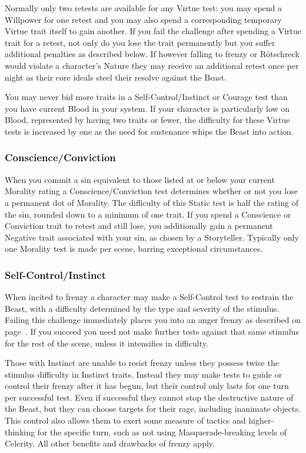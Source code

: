 Normally only two retests are available for any Virtue test:  you may spend a Willpower 
for one retest and you may also spend a corresponding temporary Virtue trait itself to 
gain another.  If you fail the challenge after spending a Virtue trait for a retest, not 
only do you lose the trait permanently but you suffer additional penalties as described 
below.  If however falling to frenzy or R\"{o}tschreck would violate a character's Nature 
they may receive an additional retest once per night as their core ideals steel their 
resolve against the Beast.

You may never bid more traits in a Self-Control/Instinct or Courage test than you have current 
Blood in your system.  If your character is particularly low on Blood, represented by having 
two traits or fewer, the difficulty for these Virtue tests is increased by one as the need for 
sustenance whips the Beast into action.

\subsubsection{Conscience/Conviction}
When you commit a sin equivalent to those listed at or below your current Morality rating 
a Conscience/Conviction test determines whether or not you lose a permanent dot of Morality.  
The difficulty of this Static test is half the rating of the sin, rounded down to a minimum 
of one trait.  If you spend a Conscience or Conviction trait to retest and still lose, you 
additionally gain a permanent Negative trait associated with your sin, as chosen by a 
Storyteller.  Typically only one Morality test is made per scene, barring exceptional 
circumstances.

\subsubsection{Self-Control/Instinct}
When incited to frenzy a character may make a Self-Control test to restrain the Beast, 
with a difficulty determined by the type and severity of the stimulus.  Failing this 
challenge immediately places you into an anger frenzy as described on 
page~\pageref{subsec:frenzy}.  If you succeed you need not make further tests against 
that same stimulus for the rest of the scene, unless it intensifies in difficulty.

Those with Instinct are unable to resist frenzy unless they possess twice the stimulus 
difficulty in Instinct traits.  Instead they may make tests to guide or control their 
frenzy after it has begun, but their control only lasts for one turn per successful test.
Even if successful they cannot stop the destructive nature of the Beast, but they can choose 
targets for their rage, including inanimate objects.  This control also allows them to 
exert some measure of tactics and higher-thinking for the specific turn, such as not using 
Masquerade-breaking levels of Celerity.  All other benefits and drawbacks of frenzy apply.

